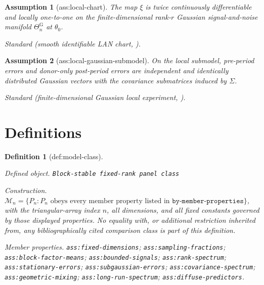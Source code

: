 \documentclass{article}
\newtheorem{assumption}{Assumption}
\newtheorem{definition}{Definition}
\begin{document}
\begin{assumption}[ass:local-chart]\label{ass:local-chart}
The map \(\xi\) is twice continuously differentiable and locally one-to-one on the finite-dimensional rank-\(r\) Gaussian signal-and-noise manifold \(\Theta_n^{\mathrm G}\) at \(\theta_0\).
\par\smallskip\noindent\emph{Standard} (smooth identifiable LAN chart, \cite{LeCamYang2000}).
\end{assumption}

\begin{assumption}[ass:local-gaussian-submodel]\label{ass:local-gaussian-submodel}
On the local submodel, pre-period errors and donor-only post-period errors are independent and identically distributed Gaussian vectors with the covariance submatrices induced by \(\Sigma\).
\par\smallskip\noindent\emph{Standard} (finite-dimensional Gaussian local experiment, \cite{ArmstrongKolesar2018OptimalInference}).
\end{assumption}

\section{Definitions}

\begin{definition}[def:model-class]\label{def:model-class}
\par\smallskip\noindent\emph{Defined object.} \texttt{Block-\allowbreak{}stable fixed-\allowbreak{}rank panel class}
\par\smallskip\noindent\emph{Construction.} \(\mathcal M_n=\{P_n:P_n\text{ obeys every member property listed in }\texttt{by-member-properties}\}\), with the triangular-array index \(n\), all dimensions, and all fixed constants governed by those displayed properties.  No equality with, or additional restriction inherited from, any bibliographically cited comparison class is part of this definition.
\par\smallskip\noindent\emph{Member properties.} \texttt{ass:\allowbreak{}fixed-\allowbreak{}dimensions}; \texttt{ass:\allowbreak{}sampling-\allowbreak{}fractions}; \texttt{ass:\allowbreak{}block-\allowbreak{}factor-\allowbreak{}means}; \texttt{ass:\allowbreak{}bounded-\allowbreak{}signals}; \texttt{ass:\allowbreak{}rank-\allowbreak{}spectrum}; \texttt{ass:\allowbreak{}stationary-\allowbreak{}errors}; \texttt{ass:\allowbreak{}subgaussian-\allowbreak{}errors}; \texttt{ass:\allowbreak{}covariance-\allowbreak{}spectrum}; \texttt{ass:\allowbreak{}geometric-\allowbreak{}mixing}; \texttt{ass:\allowbreak{}long-\allowbreak{}run-\allowbreak{}spectrum}; \texttt{ass:\allowbreak{}diffuse-\allowbreak{}predictors}.
\end{definition}
\end{document}
